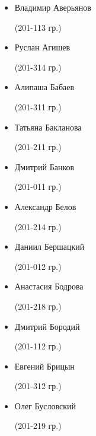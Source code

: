 \setlength{\columnsep}{0.5em}
\begin{multicols}{2}
\begin{small}
\begin{itemize}[leftmargin=0.5em]\itemsep1pt \parskip0pt 

	\item[] Владимир Аверьянов\begin{tiny} (201-113 гр.)\end{tiny} %
	\item[] Руслан Агишев\begin{tiny} (201-314 гр.)\end{tiny} %

	\item[] Алипаша Бабаев\begin{tiny} (201-311 гр.)\end{tiny} %
	\item[] Татьяна Бакланова\begin{tiny} (201-211 гр.)\end{tiny}
	\item[] Дмитрий Банков\begin{tiny} (201-011 гр.)\end{tiny}
	\item[] Александр Белов\begin{tiny} (201-214 гр.)\end{tiny}
	\item[] Даниил Бершацкий\begin{tiny} (201-012 гр.)\end{tiny}
	\item[] Анастасия Бодрова\begin{tiny} (201-218 гр.)\end{tiny} %
	\item[] Дмитрий Бородий\begin{tiny} (201-112 гр.)\end{tiny}
	\item[] Евгений Брицын\begin{tiny} (201-312 гр.)\end{tiny} %
	\item[] Олег Бусловский\begin{tiny} (201-219 гр.)\end{tiny} %


\end{itemize}
\end{small}
\end{multicols}
